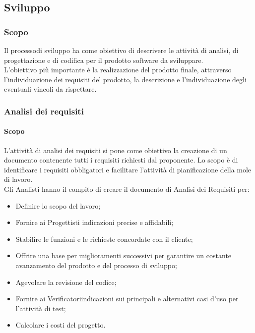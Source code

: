 \subsection{Sviluppo} 
\subsubsection{Scopo} 
Il processo\glo di sviluppo ha come obiettivo di descrivere le attività di analisi, di progettazione e di codifica per il prodotto software da sviluppare. \\
L'obiettivo più importante è la realizzazione del prodotto finale, attraverso l'individuazione dei requisiti del prodotto, 
la descrizione e l'individuazione degli eventuali vincoli da rispettare.


\subsubsection{Analisi dei requisiti} 
\paragraph{Scopo} 
L'attività di analisi dei requisiti si pone come obiettivo la creazione di un documento contenente tutti i requisiti richiesti dal proponente.
Lo scopo è di identificare i requisiti obbligatori e facilitare l'attività di pianificazione della mole di lavoro.\\
Gli Analisti hanno il compito di creare il documento di Analisi dei Requisiti per:
\begin{itemize}
    \item Definire lo scopo del lavoro;
    \item Fornire ai Progettisti indicazioni precise e affidabili;
    \item Stabilire le funzioni e le richieste concordate con il cliente;
    \item Offrire una base per miglioramenti successivi per garantire un costante avanzamento del prodotto e del processo di sviluppo;
    \item Agevolare la revisione del codice;
    \item Fornire ai Verificatori\glo indicazioni sui principali e alternativi casi d'uso per l'attività di test;
    \item Calcolare i costi del progetto.
\end{itemize}   

